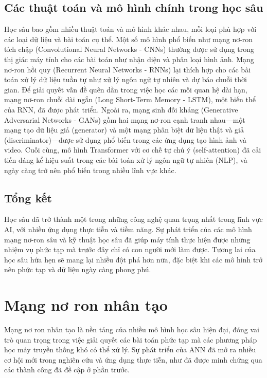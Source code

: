 \documentclass[12pt]{report}
\begin{document}
\subsection{Các thuật toán và mô hình chính trong học sâu}

Học sâu bao gồm nhiều thuật toán và mô hình khác nhau, mỗi loại phù hợp với các loại dữ liệu và bài toán cụ thể. Một số mô hình phổ biến như mạng nơ-ron tích chập (Convolutional Neural Networks - CNNs) thường được sử dụng trong thị giác máy tính cho các bài toán như nhận diện và phân loại hình ảnh. Mạng nơ-ron hồi quy (Recurrent Neural Networks - RNNs) lại thích hợp cho các bài toán xử lý dữ liệu tuần tự như xử lý ngôn ngữ tự nhiên và dự báo chuỗi thời gian. Để giải quyết vấn đề quên dần trong việc học các mối quan hệ dài hạn, mạng nơ-ron chuỗi dài ngắn (Long Short-Term Memory - LSTM), một biến thể của RNN, đã được phát triển. Ngoài ra, mạng sinh đối kháng (Generative Adversarial Networks - GANs) gồm hai mạng nơ-ron cạnh tranh nhau—một mạng tạo dữ liệu giả (generator) và một mạng phân biệt dữ liệu thật và giả (discriminator)—được sử dụng phổ biến trong các ứng dụng tạo hình ảnh và video. Cuối cùng, mô hình Transformer với cơ chế tự chú ý (self-attention) đã cải tiến đáng kể hiệu suất trong các bài toán xử lý ngôn ngữ tự nhiên (NLP), và ngày càng trở nên phổ biến trong nhiều lĩnh vực khác.

\subsection{Tổng kết}

Học sâu đã trở thành một trong những công nghệ quan trọng nhất trong lĩnh vực AI, với nhiều ứng dụng thực tiễn và tiềm năng. Sự phát triển của các mô hình mạng nơ-ron sâu và kỹ thuật học sâu đã giúp máy tính thực hiện được những nhiệm vụ phức tạp mà trước đây chỉ có con người mới làm được. Tương lai của học sâu hứa hẹn sẽ mang lại nhiều đột phá hơn nữa, đặc biệt khi các mô hình trở nên phức tạp và dữ liệu ngày càng phong phú.

\section{Mạng nơ ron nhân tạo}

Mạng nơ ron nhân tạo là nền tảng của nhiều mô hình học sâu hiện đại, đóng vai trò quan trọng trong việc giải quyết các bài toán phức tạp mà các phương pháp học máy truyền thống khó có thể xử lý. Sự phát triển của ANN đã mở ra nhiều cơ hội mới trong nghiên cứu và ứng dụng thực tiễn, như đã được minh chứng qua các thành công đã đề cập ở phần trước.
\end{document}
